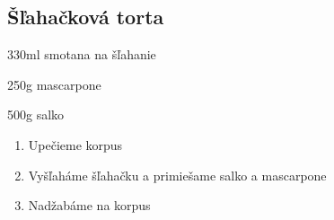 \setcounter{step}{0}
\subsection{Šľahačková torta}

\begin{ingredient}
\def\portions{4}%

\begin{main}
	\item 330ml smotana na šľahanie
	\item 250g mascarpone
	\item 500g salko
\end{main}
\end{ingredient}
\begin{recipe}

\begin{enumerate}

\item{Upečieme korpus}
\item{Vyšľaháme šľahačku a primiešame salko a mascarpone}
\item{Nadžabáme na korpus}

\end{enumerate}
\end{recipe}

\begin{notes}

\end{notes}
\clearpage	